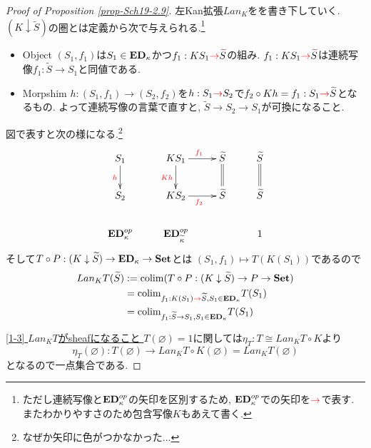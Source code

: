 \documentclass[dvipdfmx,a4paper,11pt]{article}
\newcommand{\colim}{{\rm colim}}
\theoremstyle{definition}
\newcommand{\xr}[1]{\textcolor{red}{#1}}
\begin{document}
\begin{proof}[Proof of Proposition \ref{prop-Sch19-2.9}]
左Kan拡張$Lan_{K}$をを書き下していく. 
$ (K \downarrow \widetilde{S})$の圏とは定義から次で与えられる.\footnote{ただし連続写像と${\bf ED}_{\kappa}^{op}$の矢印を区別するため, ${\bf ED}_{\kappa}^{op}$での矢印を$\xr{\to}$で表す. またわかりやすさのため包含写像$K$もあえて書く.}
\begin{itemize}
\item Object $(S_1, f_1)$は$S_1 \in {\bf ED}_{\kappa}$かつ$f_1: KS_1 \xr{\to} \widetilde{S}$の組み.
$f_1: KS_1 \xr{\to} \widetilde{S}$は連続写像$f_1 : \widetilde{S} \to S_1$と同値である. 
\item Morpshim $h : (S_1, f_1) \to (S_2, f_2)$を$h : S_1 \xr{\to} S_2$で$f_2 \circ Kh = f_1  : S_1 \xr{\to} \widetilde{S}$となるもの. 
よって連続写像の言葉で直すと, $\widetilde{S} \to S_2 \to S_1$が可換になること. 
\end{itemize}
 図で表すと次の様になる.\footnote{なぜか矢印に色がつかなかった...}
\begin{equation*}
\xymatrix@C=25pt@R=20pt{
S_1\ar@{->}[d] _{\xr{h}}
&KS_1\ar@{->}[d]_{\xr{Kh}}  \ar@{->}[r]^{\xr{f_1}} 
& \widetilde{S}\ar@{=}[d]
&\widetilde{S}\ar@{=}[d]
\\
S_2
&KS_2 \ar@{->}[r]_{\xr{f_2}} 
&\widetilde{S}
&\widetilde{S}
 \\   
{\bf ED}_{\kappa}^{op}
&{\bf ED}_{\widetilde{\kappa}}^{op}
&
&1 
\\   
}
\end{equation*}
そして$T \circ P : (K \downarrow \widetilde{S}) \to {\bf ED}_{\kappa} \to {\bf Set}$とは
$(S_1, f_1) \mapsto T(K(S_1))$であるので
\begin{align*}
\begin{split}
Lan_{K}T (\widetilde{S})
&:=
\colim(T \circ P : (K \downarrow \widetilde{S}) \to P \to {\bf Set})\\
&=
\colim_{f_1: K(S_1) \xr{\to} \widetilde{S}, S_1 \in  {\bf ED}_{\kappa} }T(S_1)\\
&=
\colim_{f_1 : \widetilde{S} \to S_1, S_1 \in  {\bf ED}_{\kappa}}T(S_1) \\
\end{split}
\end{align*}

\underline{[1-3] $Lan_{K}T$がsheafになること }
$T(\varnothing)=1$に関しては$\eta_{T} : T \cong Lan_{K}T\circ  K$より
$$
\eta_{T}(\varnothing)  : T(\varnothing) \to   Lan_{K}T\circ  K(\varnothing)=Lan_{K}T(\varnothing)
$$
となるので一点集合である.


\end{proof}
\end{document}
